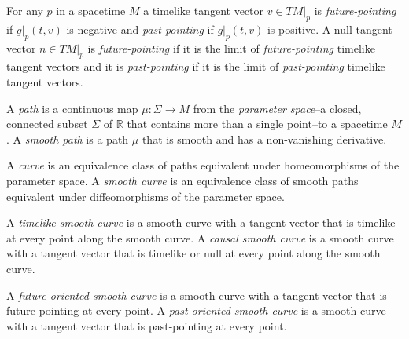 \begin{definition}
    \label{def:future-and-past-pointing-vectors}
    For any $p$ in a spacetime $M$ a timelike tangent vector $v \in TM|_p$ is \textit{future-pointing} if $g|_p(t,v)$ is negative and \textit{past-pointing} if $g|_p(t,v)$ is positive. A null tangent vector $n \in TM|_p$ is \textit{future-pointing} if it is the limit of \textit{future-pointing} timelike tangent vectors and it is \textit{past-pointing} if it is the limit of \textit{past-pointing} timelike tangent vectors.
\end{definition}

\begin{definition}[Paths]
    \label{def:paths}
    A \textit{path} is a continuous map $\mu :\Sigma \rightarrow M$ from the \textit{parameter space}--a closed, connected subset $\Sigma$ of $\mathbb{R}$ that contains more than a single point--to a spacetime $M$. A \textit{smooth path} is a path $\mu$ that is smooth and has a non-vanishing derivative.
\end{definition}

\begin{definition}[Curves]
    \label{def:curves}
    A \textit{curve} is an equivalence class of paths equivalent under homeomorphisms of the parameter space. A \textit{smooth curve} is an equivalence class of smooth paths equivalent under diffeomorphisms of the parameter space.
\end{definition}

\begin{definition}
    \label{def:timelike-and-causal-smooth-curves}
    A \textit{timelike smooth curve} is a smooth curve with a tangent vector that is timelike at every point along the smooth curve. A \textit{causal smooth curve} is a smooth curve with a tangent vector that is timelike or null at every point along the smooth curve.
\end{definition}

\begin{definition}
    \label{def:future-and-past-oriented-smooth-curves}
    A \textit{future-oriented smooth curve} is a smooth curve with a tangent vector that is future-pointing at every point. A \textit{past-oriented smooth curve} is a smooth curve with a tangent vector that is past-pointing at every point.
\end{definition}

